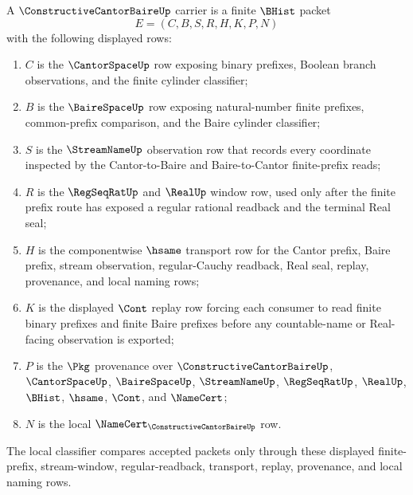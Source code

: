 \begin{definition}
\label{def:constructive-cantor-baire-carrier}
A $\ConstructiveCantorBaireUp$ carrier is a finite $\BHist$ packet
$$
E=(C,B,S,R,H,K,P,N)
$$
with the following displayed rows:
\begin{enumerate}
\item $C$ is the $\CantorSpaceUp$ row exposing binary prefixes, Boolean branch observations, and the finite cylinder classifier;
\item $B$ is the $\BaireSpaceUp$ row exposing natural-number finite prefixes, common-prefix comparison, and the Baire cylinder classifier;
\item $S$ is the $\StreamNameUp$ observation row that records every coordinate inspected by the Cantor-to-Baire and Baire-to-Cantor finite-prefix reads;
\item $R$ is the $\RegSeqRatUp$ and $\RealUp$ window row, used only after the finite prefix route has exposed a regular rational readback and the terminal Real seal;
\item $H$ is the componentwise $\hsame$ transport row for the Cantor prefix, Baire prefix, stream observation, regular-Cauchy readback, Real seal, replay, provenance, and local naming rows;
\item $K$ is the displayed $\Cont$ replay row forcing each consumer to read finite binary prefixes and finite Baire prefixes before any countable-name or Real-facing observation is exported;
\item $P$ is the $\Pkg$ provenance over $\ConstructiveCantorBaireUp$, $\CantorSpaceUp$, $\BaireSpaceUp$, $\StreamNameUp$, $\RegSeqRatUp$, $\RealUp$, $\BHist$, $\hsame$, $\Cont$, and $\NameCert$;
\item $N$ is the local $\NameCert_{\ConstructiveCantorBaireUp}$ row.
\end{enumerate}
The local classifier compares accepted packets only through these displayed finite-prefix, stream-window, regular-readback, transport, replay, provenance, and local naming rows.
\end{definition}

